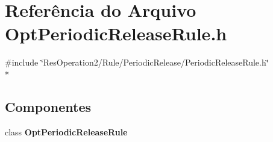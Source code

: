 \section{Referência do Arquivo Opt\+Periodic\+Release\+Rule.\+h}
\label{_opt_periodic_release_rule_8h}
{\ttfamily \#include \char`\"{}Res\+Operation2/\+Rule/\+Periodic\+Release/\+Periodic\+Release\+Rule.\+h\char`\"{}}\\*
\subsection*{Componentes}
\begin{DoxyCompactItemize}
\item 
class {\bf Opt\+Periodic\+Release\+Rule}
\end{DoxyCompactItemize}
